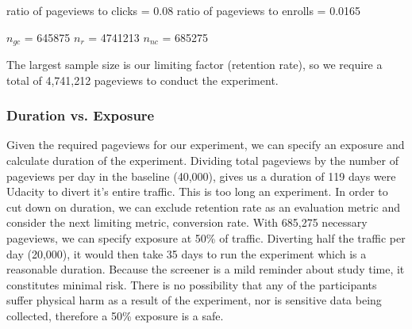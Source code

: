 \documentclass[paper=a4, fontsize=11pt]{scrartcl} %
\numberwithin{equation}{section} %
\numberwithin{figure}{section} %
\numberwithin{table}{section} %
\begin{document}
ratio of pageviews to clicks = 0.08 \newline
ratio of pageviews to enrolls = 0.0165 \newline


$n_{gc}$ = 645875\quad
$n_{r}$ = 4741213\quad
$n_{nc}$ = 685275
\newline

The largest sample size is our limiting factor (retention rate), so we require a total of 4,741,212 pageviews to conduct the experiment. \newline


\subsubsection{Duration vs. Exposure}


Given the required pageviews for our experiment, we can specify an exposure and calculate duration of the experiment.  Dividing total pageviews by the number of pageviews per day in the baseline (40,000), gives us a duration of 119 days were Udacity to divert it's entire traffic.  This is too long an experiment.  In order to cut down on duration, we can exclude retention rate as an evaluation metric and consider the next limiting metric, conversion rate.  With 685,275 necessary pageviews, we can specify exposure at 50\% of traffic.  Diverting half the traffic per day (20,000), it would then take 35 days to run the experiment which is a reasonable duration.  Because the screener is a mild reminder about study time, it constitutes minimal risk.  There is no possibility that any of the participants suffer physical harm as a result of the experiment, nor is sensitive data being collected, therefore a 50\% exposure is a safe. \newline

\end{document}
